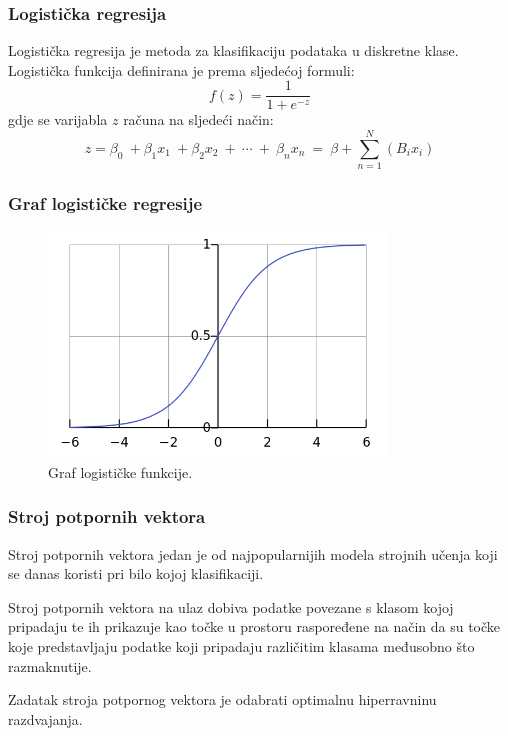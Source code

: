 \documentclass{beamer}
\begin{document}
\begin{frame}
\frametitle{Logistička regresija}
Logistička regresija je metoda za klasifikaciju podataka u diskretne klase.
\bigskip
Logistička funkcija definirana je prema sljedećoj formuli:
\begin{equation}
\label{logiFun}
f\left(z\right)=\frac{1}{1+e^{-z}}
\end{equation}
\noindent gdje se varijabla $z$ računa na sljedeći način: \\
\begin{equation}
\label{logiZ}
z=\beta_{0}\:+\beta_{1}x_{1}\:+\beta_{2}x_{2}\:+\:\cdots\:+\:\beta_{n}x_{n}\:=\:\beta +\sum _{n=1}^N\left(B_{i}x_{i}\right)
\end{equation}
\end{frame}

\begin{frame}
\frametitle{Graf logističke regresije}
\begin{figure}[]
	\centering
	\includegraphics[width=9cm]{img/logistic.png}
	\caption{Graf logističke funkcije. }
	\label{fig:logistic}
\end{figure}
\end{frame}

\begin{frame}
\frametitle{Stroj potpornih vektora}
Stroj potpornih vektora jedan je od najpopularnijih modela strojnih učenja koji se danas koristi pri bilo kojoj klasifikaciji.
\bigskip

Stroj potpornih vektora na ulaz dobiva podatke povezane s klasom kojoj pripadaju te ih prikazuje kao točke u prostoru raspoređene na način da su točke koje predstavljaju podatke koji pripadaju različitim klasama međusobno što razmaknutije.
\bigskip

Zadatak stroja potpornog vektora je odabrati optimalnu hiperravninu razdvajanja.

\end{frame}
\end{document}
